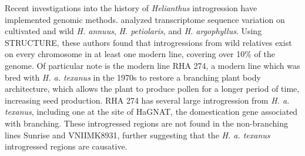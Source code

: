 \documentclass[11pt]{article}
\begin{document}
\begin{enumerate}
Recent investigations into the history of \emph{Helianthus} introgression have implemented genomic methods.
\cite{Baute2015} analyzed transcriptome sequence variation on cultivated and wild \emph{H. annuus}, \emph{H. petiolaris}, and \emph{H. argophyllus}.
Using STRUCTURE, these authors found that introgressions from wild relatives exist on every chromosome in at least one modern line, covering over 10\% of the genome.
Of particular note is the modern line RHA 274, a modern line which was bred with \emph{H. a. texanus} in the 1970s to restore a branching plant body architecture, which allows the plant to produce pollen for a longer period of time, increasing seed production.
RHA 274 has several large introgression from \emph{H. a. texanus}, including one at the site of HaGNAT, the domestication gene associated with branching.
These introgressed regions are not found in the non-branching lines Sunrise and VNIIMK8931, further suggesting that the \emph{H. a. texanus} introgressed regions are causative.












\end{enumerate}
\end{document}
